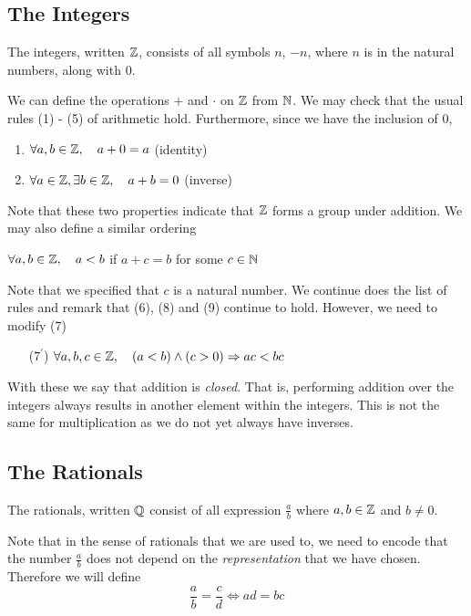 \documentclass{article}
\begin{document}
\subsection{The Integers}
\begin{defi}
    The integers, written $\mathbb{Z}$, consists of all symbols $n$, $-n$, where $n$ is in the natural numbers, along with $0$.
\end{defi}
We can define the operations $+$ and $\cdot$ on $\mathbb{Z}$ from $\mathbb{N}$. We may check that the usual rules (1) - (5) of arithmetic hold. Furthermore, since we have the inclusion of $0$,
\begin{enumerate}[start=10, label=(\arabic*)]
    \item $\forall a, b \in \mathbb{Z}, \quad a + 0 = a$ \hspace*{\fill}(identity)
    \item $\forall a \in \mathbb{Z}, \exists b \in \mathbb{Z}, \quad a + b = 0$ \hspace*{\fill}(inverse)
\end{enumerate}
Note that these two properties indicate that $\mathbb{Z}$ forms a group under addition. We may also define a similar ordering
\begin{defi}
    $\forall a, b \in \mathbb{Z}, \quad a < b$ if $a + c = b$ for some $c \in \mathbb{N}$
\end{defi}
Note that we specified that $c$ is a natural number. We continue does the list of rules and remark that (6), (8) and (9) continue to hold. However, we need to modify (7)
\begin{enumerate}
    \item[($\text{7}^{\prime}$)]  $\forall a, b, c \in \mathbb{Z}, \quad (a < b) \wedge (c > 0) \Rightarrow ac < bc$
\end{enumerate}
With these we say that addition is \emph{closed}. That is, performing addition over the integers always results in another element within the integers. This is not the same for multiplication as we do not yet always have inverses.

\subsection{The Rationals}
\begin{defi}
    The rationals, written $\mathbb{Q}$ consist of all expression $\frac{a}{b}$ where $a, b \in \mathbb{Z}$ and $b \neq 0$.
\end{defi}

Note that in the sense of rationals that we are used to, we need to encode that the number $\frac{a}{b}$ does not depend on the \emph{representation} that we have chosen. Therefore we will define
\[
    \frac{a}{b} = \frac{c}{d} \Leftrightarrow ad = bc
\]
\end{document}

